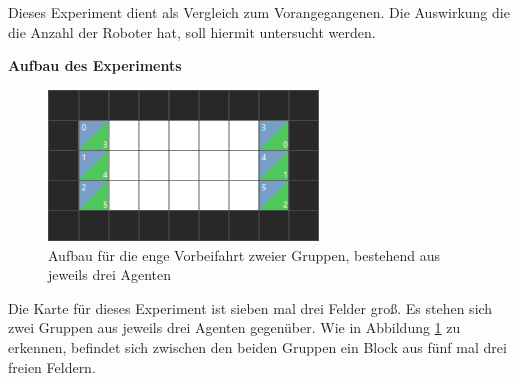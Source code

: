 Dieses Experiment dient als Vergleich zum Vorangegangenen. Die Auswirkung die die Anzahl der Roboter hat, soll hiermit untersucht werden. 

\textbf{Aufbau des Experiments}
\begin{figure}[H]
    \includegraphics[height=40mm]{images/3vs3.png}
    \centering
    \caption{Aufbau für die enge Vorbeifahrt zweier Gruppen, bestehend aus jeweils drei Agenten}
    \label{fig:3x3}
\end{figure}
Die Karte für dieses Experiment ist sieben mal drei Felder groß. Es stehen sich zwei Gruppen aus jeweils drei Agenten gegenüber. Wie in Abbildung \ref{fig:3x3} zu erkennen, befindet sich zwischen den beiden Gruppen ein Block aus fünf mal drei freien Feldern.